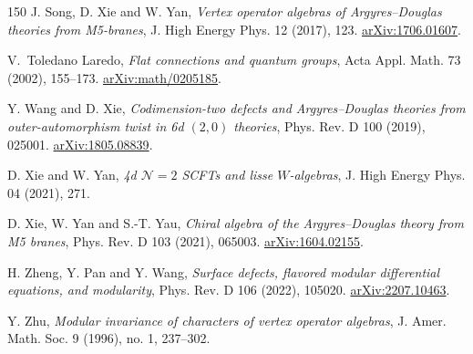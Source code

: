 \documentclass[11pt,a4paper]{amsart}
\numberwithin{equation}{section}
\theoremstyle{definition}
\theoremstyle{remark}
\newcommand{\arxiv}[1]{\href{https://arxiv.org/abs/#1}{arXiv:#1}}
\begin{document}
\begin{thebibliography}{150}
 J. Song, D. Xie and W. Yan,
\emph{Vertex operator algebras of Argyres--Douglas theories from M5-branes},
J. High Energy Phys. 12 (2017), 123. \arxiv{1706.01607}.

 V.~Toledano Laredo,
\emph{Flat connections and quantum groups},
Acta Appl. Math. 73 (2002), 155--173. \arxiv{math/0205185}.

 Y. Wang and D. Xie,
\emph{Codimension-two defects and Argyres--Douglas theories from outer-automorphism twist in 6d $(2,0)$ theories},
Phys. Rev. D 100 (2019), 025001. \arxiv{1805.08839}.

 D. Xie and W. Yan,
\emph{4d $\mathcal N=2$ SCFTs and lisse $W$-algebras},
J. High Energy Phys. 04 (2021), 271. 

 D. Xie, W. Yan and S.-T. Yau,
\emph{Chiral algebra of the Argyres--Douglas theory from M5 branes},
Phys. Rev. D 103 (2021), 065003. \arxiv{1604.02155}.

 H. Zheng, Y. Pan and Y. Wang,
\emph{Surface defects, flavored modular differential equations, and modularity},
Phys. Rev. D 106 (2022), 105020. \arxiv{2207.10463}.

 Y. Zhu,
\emph{Modular invariance of characters of vertex operator algebras},
J. Amer. Math. Soc. 9 (1996), no. 1, 237--302.

\end{thebibliography}
\bigskip
\end{document}
